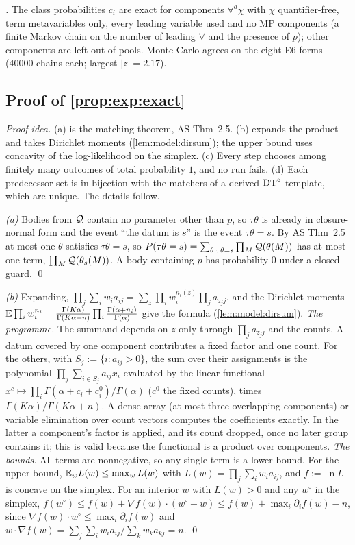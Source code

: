 \emph{\Lselc.} The class probabilities $c_i$ are exact for components $\forall^a\chi$ with $\chi$ quantifier-free, term metavariables only, every leading variable used and no MP components (a finite Markov chain on the number of leading $\forall$ and the presence of $p$); other components are left out of \Lselc{} pools. Monte Carlo agrees on the eight E6 forms (40000 chains each; largest $|z|=2.17$).

\subsection{Proof of \texorpdfstring{\cref{prop:exp:exact}}{the exactness proposition}}\label{app:exp:exact}

\emph{Proof idea.} (a) is the matching theorem, AS Thm~2.5. (b) expands the product and takes Dirichlet moments (\cref{lem:model:dirsum}); the upper bound uses concavity of the log-likelihood on the simplex. (c) Every step chooses among finitely many outcomes of total probability $1$, and no run fails. (d) Each predecessor set is in bijection with the matchers of a derived $\mathrm{DT}^{\circ}$ template, which are unique. The details follow.

\emph{(a)} Bodies from $\mathcal{Q}$ contain no parameter other than $p$, so $\tau\theta$ is already in closure-normal form and the event ``the datum is $s$'' is the event $\tau\theta=s$. By AS Thm~2.5 at most one $\theta$ satisfies $\tau\theta=s$, so $P(\tau\theta=s)=\sum_{\theta:\tau\theta=s}\prod_M\mathcal{Q}(\theta(M))$ has at most one term, $\prod_M\mathcal{Q}(\theta_s(M))$. A body containing $p$ has probability $0$ under a closed guard. \qed

\emph{(b)} Expanding, $\prod_j\sum_iw_ia_{ij}=\sum_z\prod_iw_i^{n_i(z)}\prod_ja_{z_jj}$, and the Dirichlet moments $\mathbb{E}\prod_iw_i^{n_i}=\frac{\Gamma(K\alpha)}{\Gamma(K\alpha+n)}\prod_i\frac{\Gamma(\alpha+n_i)}{\Gamma(\alpha)}$ give the formula (\cref{lem:model:dirsum}).
\emph{The programme.} The summand depends on $z$ only through $\prod_ja_{z_jj}$ and the counts. A datum covered by one component contributes a fixed factor and one count. For the others, with $S_j:=\{i:a_{ij}>0\}$, the sum over their assignments is the polynomial $\prod_j\sum_{i\in S_j}a_{ij}x_i$ evaluated by the linear functional $x^c\mapsto\prod_i\Gamma(\alpha+c_i+c^0_i)/\Gamma(\alpha)$ ($c^0$ the fixed counts), times $\Gamma(K\alpha)/\Gamma(K\alpha+n)$. A dense array (at most three overlapping components) or variable elimination over count vectors computes the coefficients exactly. In the latter a component's factor is applied, and its count dropped, once no later group contains it; this is valid because the functional is a product over components.
\emph{The bounds.} All terms are nonnegative, so any single term is a lower bound. For the upper bound, $\mathbb{E}_wL(w)\le\max_wL(w)$ with $L(w)=\prod_j\sum_iw_ia_{ij}$, and $f:=\ln L$ is concave on the simplex. For an interior $w$ with $L(w)>0$ and any $w^\circ$ in the simplex, $f(w^\circ)\le f(w)+\nabla f(w)\cdot(w^\circ-w)\le f(w)+\max_i\partial_if(w)-n$, since $\nabla f(w)\cdot w^\circ\le\max_i\partial_if(w)$ and $w\cdot\nabla f(w)=\sum_j\sum_iw_ia_{ij}/\sum_kw_ka_{kj}=n$. \qed


